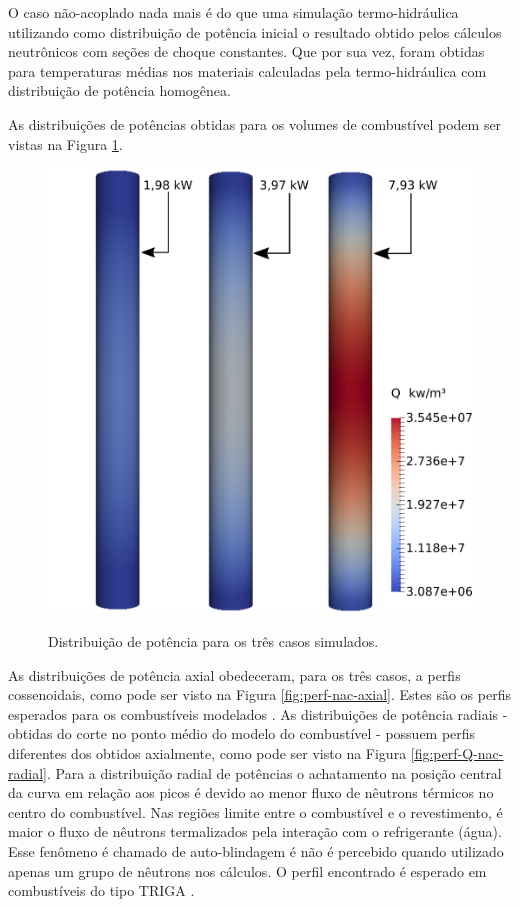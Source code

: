 O caso não-acoplado nada mais é do que uma simulação termo-hidráulica utilizando como distribuição de potência
inicial o resultado obtido pelos cálculos neutrônicos com seções de choque constantes. Que por sua vez, foram
obtidas para temperaturas médias nos materiais calculadas pela termo-hidráulica com distribuição de potência
homogênea.

As distribuições de potências obtidas para os volumes de combustível podem ser vistas na Figura \ref{fig:pot-nc}.

\begin{figure}[htb]
  \caption[Distribuição de potência para os três casos simulados.]{Distribuição de potência para os três casos simulados.}
  \centering\includegraphics[scale=0.5]{figuras/Q_fuel_all_NC.png}
  \label{fig:pot-nc}
\end{figure}

As distribuições de potência axial obedeceram, para os três casos, a perfis
cossenoidais, como pode ser visto na Figura \ref{fig:perf-nac-axial}. Estes são os perfis esperados para
os combustíveis modelados \cite{Veloso2005}. As distribuições de potência radiais -
obtidas do corte no ponto médio do modelo do combustível - possuem perfis diferentes
dos obtidos axialmente, como pode ser visto na Figura \ref{fig:perf-Q-nac-radial}. 
Para a distribuição radial de potências o achatamento na posição central
da curva em relação aos picos é devido ao menor fluxo de nêutrons térmicos no centro do combustível. Nas regiões limite
entre o combustível e o revestimento, é maior o fluxo de nêutrons termalizados pela interação com o refrigerante (água).
Esse fenômeno é chamado de auto-blindagem é não é percebido quando utilizado apenas um grupo
de nêutrons nos cálculos. O perfil encontrado é esperado em combustíveis do tipo TRIGA \cite{Ravnik1990}.

